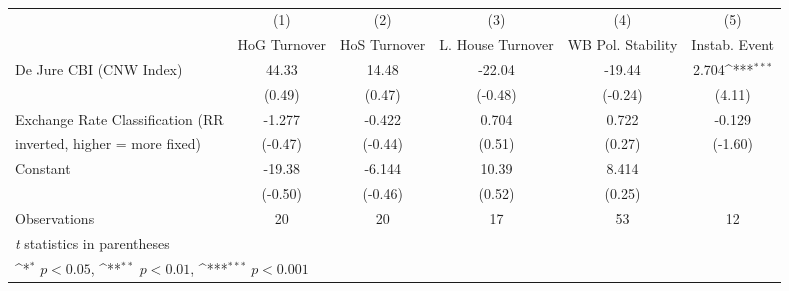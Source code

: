 \begin{table}[htbp]\centering
\def\sym#1{\ifmmode^{#1}\else\(^{#1}\)\fi}
\caption{\label{hiKfivs3}}
\begin{tabular}{l*{5}{c}}
\toprule
                                        &\multicolumn{1}{c}{(1)}&\multicolumn{1}{c}{(2)}&\multicolumn{1}{c}{(3)}&\multicolumn{1}{c}{(4)}&\multicolumn{1}{c}{(5)}\\
                                        &\multicolumn{1}{c}{HoG Turnover}&\multicolumn{1}{c}{HoS Turnover}&\multicolumn{1}{c}{L. House Turnover}&\multicolumn{1}{c}{WB Pol. Stability}&\multicolumn{1}{c}{Instab. Event}\\
\midrule
De Jure CBI (CNW Index)                 &    44.33         &    14.48         &   -22.04         &   -19.44         &    2.704\sym{***}\\
                                        &   (0.49)         &   (0.47)         &  (-0.48)         &  (-0.24)         &   (4.11)         \\
\addlinespace
Exchange Rate Classification (RR        &   -1.277         &   -0.422         &    0.704         &    0.722         &   -0.129         \\
inverted, higher = more fixed)          &  (-0.47)         &  (-0.44)         &   (0.51)         &   (0.27)         &  (-1.60)         \\
\addlinespace
Constant                                &   -19.38         &   -6.144         &    10.39         &    8.414         &                  \\
                                        &  (-0.50)         &  (-0.46)         &   (0.52)         &   (0.25)         &                  \\
\midrule
Observations                            &       20         &       20         &       17         &       53         &       12         \\
\bottomrule
\multicolumn{6}{l}{\footnotesize \textit{t} statistics in parentheses}\\
\multicolumn{6}{l}{\footnotesize \sym{*} \(p<0.05\), \sym{**} \(p<0.01\), \sym{***} \(p<0.001\)}\\
\end{tabular}
\end{table}
